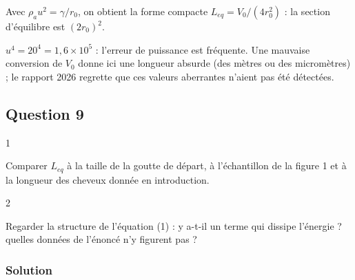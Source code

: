 \documentclass[11pt,a4paper]{article}
\begin{document}
Avec \(\rho_a u^2 = \gamma/r_0\), on obtient la forme compacte \(L_{eq} = V_0/(4r_0^2)\) : la section d'équilibre est \((2r_0)^2\).

\begin{piege}

\(u^4 = 20^4 = 1{,}6\times10^5\) : l'erreur de puissance est fréquente. Une mauvaise conversion de \(V_0\) donne ici une longueur absurde (des mètres ou des micromètres) ; le rapport 2026 regrette que ces valeurs aberrantes n'aient pas été détectées.

\end{piege}

\hypertarget{question-9}{%
\subsection{Question 9}\label{question-9}}

\begin{indication}{1}

Comparer \(L_{eq}\) à la taille de la goutte de départ, à l'échantillon de la figure 1 et à la longueur des cheveux donnée en introduction.

\end{indication}

\begin{indication}{2}

Regarder la structure de l'équation (1) : y a-t-il un terme qui dissipe l'énergie ? quelles données de l'énoncé n'y figurent pas ?

\end{indication}

\hypertarget{solution-8}{%
\subsubsection{Solution}\label{solution-8}}
\end{document}
